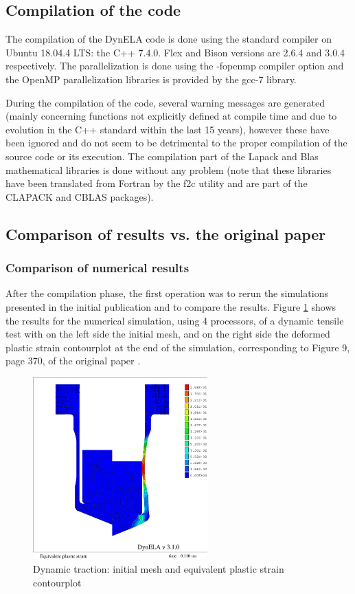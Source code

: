 \subsection{Compilation of the code}

The compilation of the DynELA code is done using the standard compiler on Ubuntu 18.04.4 LTS: the C++ 7.4.0. Flex and Bison versions are 2.6.4 and 3.0.4 respectively. The parallelization is done using the -fopenmp compiler option and the OpenMP parallelization libraries is provided by the gcc-7 library.

During the compilation of the code, several warning messages are generated (mainly concerning functions not explicitly defined at compile time and due to evolution in the C++ standard within the last 15 years), however these have been ignored and do not seem to be detrimental to the proper compilation of the source code or its execution. The compilation part of the Lapack and Blas mathematical libraries is done without any problem (note that these libraries have been translated from Fortran by the f2c utility and are part of the CLAPACK and CBLAS packages).

\subsection{Comparison of results vs. the original paper}

\subsubsection{Comparison of numerical results}\label{Ptensile}

After the compilation phase, the first operation was to rerun the simulations presented in the initial publication and to compare the results. Figure \ref{strain} shows the results for the numerical simulation, using 4 processors, of a dynamic tensile test with on the left side the initial mesh, and on the right side the deformed plastic strain contourplot at the end of the simulation, corresponding to Figure 9, page 370, of the original paper \cite{Pantale:2005}.

\begin{figure}[h!] 
  \centering
  \includegraphics[width=0.6\textwidth]{./strain.pdf}
  \caption{Dynamic traction: initial mesh and equivalent plastic strain contourplot}
  \label{strain}
\end{figure}

